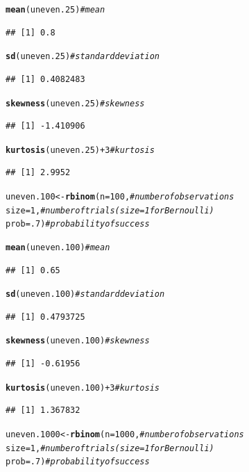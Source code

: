 \documentclass{article}\usepackage[]{graphicx}\usepackage[]{color}
\makeatletter
\newcommand{\hlnum}[1]{\textcolor[rgb]{0.686,0.059,0.569}{#1}}%
\newcommand{\hlcom}[1]{\textcolor[rgb]{0.678,0.584,0.686}{\textit{#1}}}%
\newcommand{\hlopt}[1]{\textcolor[rgb]{0,0,0}{#1}}%
\newcommand{\hlstd}[1]{\textcolor[rgb]{0.345,0.345,0.345}{#1}}%
\newcommand{\hlkwb}[1]{\textcolor[rgb]{0.69,0.353,0.396}{#1}}%
\newcommand{\hlkwc}[1]{\textcolor[rgb]{0.333,0.667,0.333}{#1}}%
\newcommand{\hlkwd}[1]{\textcolor[rgb]{0.737,0.353,0.396}{\textbf{#1}}}%
\newenvironment{kframe}{%
 \def\at@end@of@kframe{}%
 \ifinner\ifhmode%
  \def\at@end@of@kframe{\end{minipage}}%
  \begin{minipage}{\columnwidth}%
 \fi\fi%
 \def\FrameCommand##1{\hskip\@totalleftmargin \hskip-\fboxsep
 \colorbox{shadecolor}{##1}\hskip-\fboxsep
     \hskip-\linewidth \hskip-\@totalleftmargin \hskip\columnwidth}%
 \MakeFramed {\advance\hsize-\width
   \@totalleftmargin\z@ \linewidth\hsize
   \@setminipage}}%
 {\par\unskip\endMakeFramed%
 \at@end@of@kframe}
\newenvironment{knitrout}{}{} %
\makeatother
\begin{document}
\begin{enumerate}
\begin{enumerate}
\begin{knitrout}
\begin{kframe}
\begin{alltt}
\hlkwd{mean}\hlstd{(uneven.25)}                  \hlcom{#mean}
\end{alltt}
\begin{verbatim}
## [1] 0.8
\end{verbatim}
\begin{alltt}
\hlkwd{sd}\hlstd{(uneven.25)}                    \hlcom{#standard deviation}
\end{alltt}
\begin{verbatim}
## [1] 0.4082483
\end{verbatim}
\begin{alltt}
\hlkwd{skewness}\hlstd{(uneven.25)}              \hlcom{#skewness}
\end{alltt}
\begin{verbatim}
## [1] -1.410906
\end{verbatim}
\begin{alltt}
\hlkwd{kurtosis}\hlstd{(uneven.25)}\hlopt{+}\hlnum{3}            \hlcom{#kurtosis}
\end{alltt}
\begin{verbatim}
## [1] 2.9952
\end{verbatim}
\begin{alltt}
\hlstd{uneven.100} \hlkwb{<-} \hlkwd{rbinom}\hlstd{(}\hlkwc{n}\hlstd{=}\hlnum{100}\hlstd{,}      \hlcom{#number of observations}
                   \hlkwc{size}\hlstd{=}\hlnum{1}\hlstd{,}       \hlcom{#number of trials (size=1 for Bernoulli)}
                   \hlkwc{prob}\hlstd{=}\hlnum{.7}\hlstd{)}      \hlcom{#probability of success}

\hlkwd{mean}\hlstd{(uneven.100)}                 \hlcom{#mean}
\end{alltt}
\begin{verbatim}
## [1] 0.65
\end{verbatim}
\begin{alltt}
\hlkwd{sd}\hlstd{(uneven.100)}                   \hlcom{#standard deviation}
\end{alltt}
\begin{verbatim}
## [1] 0.4793725
\end{verbatim}
\begin{alltt}
\hlkwd{skewness}\hlstd{(uneven.100)}             \hlcom{#skewness}
\end{alltt}
\begin{verbatim}
## [1] -0.61956
\end{verbatim}
\begin{alltt}
\hlkwd{kurtosis}\hlstd{(uneven.100)}\hlopt{+}\hlnum{3}           \hlcom{#kurtosis}
\end{alltt}
\begin{verbatim}
## [1] 1.367832
\end{verbatim}
\begin{alltt}
\hlstd{uneven.1000} \hlkwb{<-} \hlkwd{rbinom}\hlstd{(}\hlkwc{n}\hlstd{=}\hlnum{1000}\hlstd{,}    \hlcom{#number of observations}
                    \hlkwc{size}\hlstd{=}\hlnum{1}\hlstd{,}      \hlcom{#number of trials (size=1 for Bernoulli)}
                    \hlkwc{prob}\hlstd{=}\hlnum{.7}\hlstd{)}     \hlcom{#probability of success}


\end{alltt}
\end{kframe}
\end{knitrout}
\end{enumerate}
\end{enumerate}
\end{document}
